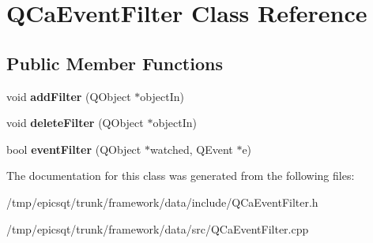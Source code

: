 \hypertarget{classQCaEventFilter}{
\section{QCaEventFilter Class Reference}
\label{classQCaEventFilter}
}
\subsection*{Public Member Functions}
\begin{DoxyCompactItemize}
\item 
\hypertarget{classQCaEventFilter_a9f4f576f73aeb2d8ae4af372d9636502}{
void {\bfseries addFilter} (QObject $\ast$objectIn)}
\label{classQCaEventFilter_a9f4f576f73aeb2d8ae4af372d9636502}

\item 
\hypertarget{classQCaEventFilter_a8c056bbade03bcce27ee42e876ef8d51}{
void {\bfseries deleteFilter} (QObject $\ast$objectIn)}
\label{classQCaEventFilter_a8c056bbade03bcce27ee42e876ef8d51}

\item 
\hypertarget{classQCaEventFilter_a8919e17ccb8b19415ec592d1f84d40c1}{
bool {\bfseries eventFilter} (QObject $\ast$watched, QEvent $\ast$e)}
\label{classQCaEventFilter_a8919e17ccb8b19415ec592d1f84d40c1}

\end{DoxyCompactItemize}


The documentation for this class was generated from the following files:\begin{DoxyCompactItemize}
\item 
/tmp/epicsqt/trunk/framework/data/include/QCaEventFilter.h\item 
/tmp/epicsqt/trunk/framework/data/src/QCaEventFilter.cpp\end{DoxyCompactItemize}
